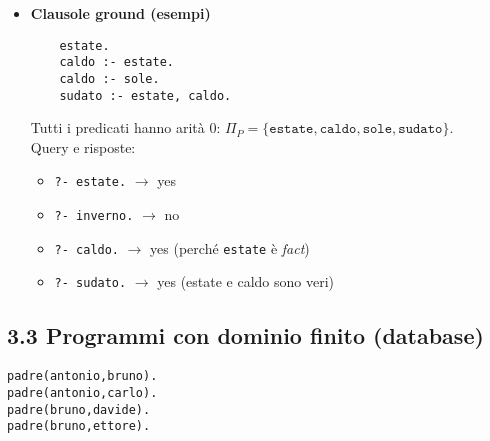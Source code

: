 \documentclass[12pt]{article}
\begin{document}
\begin{itemize}
  \item \textbf{Clausole ground (esempi)}\\
    \begin{verbatim}
    estate.
    caldo :- estate.
    caldo :- sole.
    sudato :- estate, caldo.
    \end{verbatim}
    Tutti i predicati hanno arità 0: $\Pi_P = \{\texttt{estate},\texttt{caldo},\texttt{sole},\texttt{sudato}\}$.\\
    Query e risposte:
    \begin{itemize}
      \item \texttt{?- estate.} $\to$ yes
      \item \texttt{?- inverno.} $\to$ no
      \item \texttt{?- caldo.} $\to$ yes (perché \texttt{estate} è \emph{fact})
      \item \texttt{?- sudato.} $\to$ yes (estate e caldo sono veri)
    \end{itemize}
\end{itemize}

\subsection*{3.3 Programmi con dominio finito (database)}

\begin{verbatim}
padre(antonio,bruno).
padre(antonio,carlo).
padre(bruno,davide).
padre(bruno,ettore).
\end{verbatim}
\end{document}
